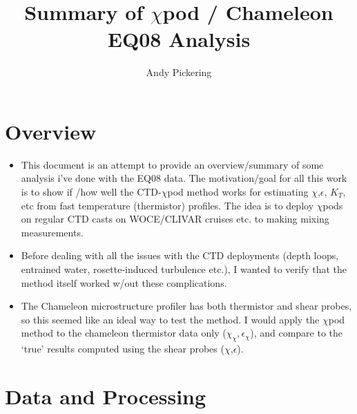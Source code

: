 \documentclass[11pt]{article}
\title{Summary of $\chi$pod / Chameleon EQ08 Analysis}
\author{Andy Pickering}
\begin{document}
\maketitle

\tableofcontents
\newpage


\section{Overview}

\begin{itemize}

\item This document is an attempt to provide an overview/summary of some analysis i've done with the EQ08 data. The motivation/goal for all this work is to show if /how well the CTD-$\chi$pod method works for estimating $\chi$,$\epsilon$, $K_T$, etc from fast temperature (thermistor) profiles. The idea is to deploy $\chi$pods on regular CTD casts on WOCE/CLIVAR cruises etc. to making mixing measurements.

\item Before dealing with all the issues with the CTD deployments (depth loops, entrained water, rosette-induced turbulence etc.), I wanted to verify that the method itself worked w/out these complications. 

\item The Chameleon microstructure profiler has both thermistor and shear probes, so this seemed like an ideal way to test the method. I would apply the $\chi$pod method to the chameleon thermistor data only ($\chi_{\chi},\epsilon_{\chi}$), and compare to the `true' results computed using the shear probes ($\chi$,$\epsilon$).


\end{itemize}




\clearpage
\section{Data and Processing}
\end{document}
